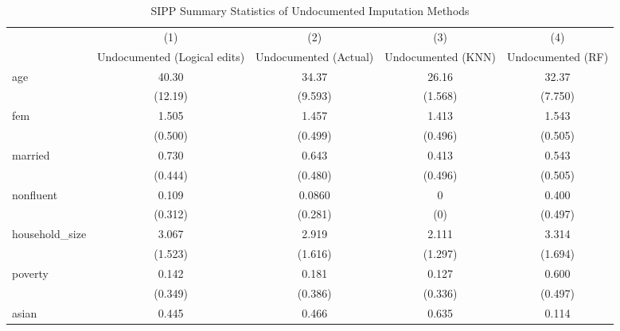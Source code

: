 \begin{table}[htbp]\centering
\def\sym#1{\ifmmode^{#1}\else\(^{#1}\)\fi}
\caption{SIPP Summary Statistics of Undocumented Imputation Methods \label{tab:sum}}
\begin{tabular}{l*{4}{c}}
\hline\hline
                    &\multicolumn{1}{c}{(1)}         &\multicolumn{1}{c}{(2)}         &\multicolumn{1}{c}{(3)}         &\multicolumn{1}{c}{(4)}         \\
                    &Undocumented (Logical edits)         &Undocumented (Actual)         &Undocumented (KNN)         &Undocumented (RF)         \\
\hline
age                 &       40.30         &       34.37         &       26.16         &       32.37         \\
                    &     (12.19)         &     (9.593)         &     (1.568)         &     (7.750)         \\
[1em]
fem                 &       1.505         &       1.457         &       1.413         &       1.543         \\
                    &     (0.500)         &     (0.499)         &     (0.496)         &     (0.505)         \\
[1em]
married             &       0.730         &       0.643         &       0.413         &       0.543         \\
                    &     (0.444)         &     (0.480)         &     (0.496)         &     (0.505)         \\
[1em]
nonfluent           &       0.109         &      0.0860         &           0         &       0.400         \\
                    &     (0.312)         &     (0.281)         &         (0)         &     (0.497)         \\
[1em]
household\_size      &       3.067         &       2.919         &       2.111         &       3.314         \\
                    &     (1.523)         &     (1.616)         &     (1.297)         &     (1.694)         \\
[1em]
poverty             &       0.142         &       0.181         &       0.127         &       0.600         \\
                    &     (0.349)         &     (0.386)         &     (0.336)         &     (0.497)         \\
[1em]
asian               &       0.445         &       0.466         &       0.635         &       0.114         \\

\end{tabular}
\end{table}
